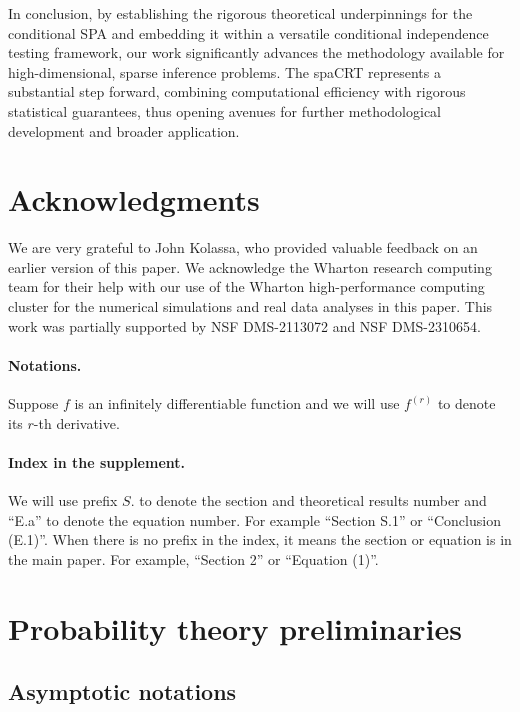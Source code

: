 \documentclass[12pt]{article}
\theoremstyle{definition}
\begin{document}
  In conclusion, by establishing the rigorous theoretical underpinnings for the conditional SPA and embedding it within a versatile conditional independence testing framework, our work significantly advances the methodology available for high-dimensional, sparse inference problems. The spaCRT represents a substantial step forward, combining computational efficiency with rigorous statistical guarantees, thus opening avenues for further methodological development and broader application.
  
  
  \section{Acknowledgments}
  
  We are very grateful to John Kolassa, who provided valuable feedback on an earlier version of this paper. We acknowledge the Wharton research computing team for their help with our use of the Wharton high-performance computing cluster for the numerical simulations and real data analyses in this paper. This work was partially supported by NSF DMS-2113072 and NSF DMS-2310654.
  


\printbibliography


\appendix


\paragraph{Notations.}

Suppose $f$ is an infinitely differentiable function and we will use $f^{(r)}$ to denote its $r$-th derivative. 

\paragraph{Index in the supplement.}

We will use prefix $S.$ to denote the section and theoretical results number and ``E.a'' to denote the equation number. For example ``Section S.1'' or ``Conclusion (E.1)''. When there is no prefix in the index, it means the section or equation is in the main paper. For example, ``Section 2'' or ``Equation (1)''.


\section{Probability theory preliminaries}


\subsection{Asymptotic notations}\label{sec:asymptotic-notations}
\end{document}
